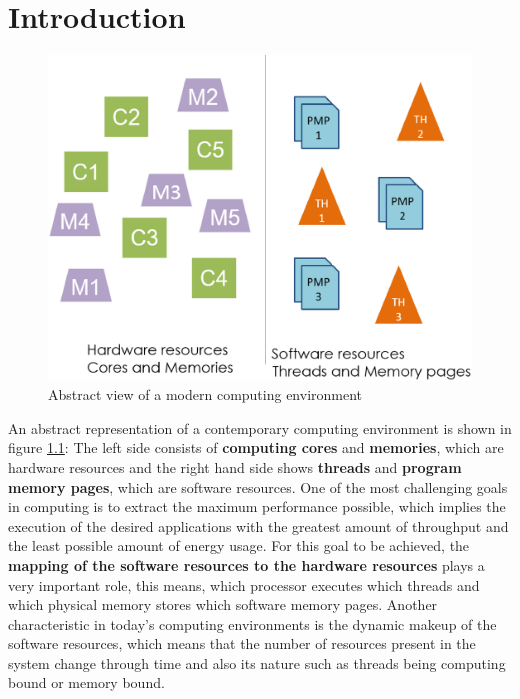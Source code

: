 \chapter{Introduction}\label{chapter:intro}

\begin{figure}[ht]
	\centering
		\includegraphics[width=.6\textwidth]{figures/abstract-env.eps}
		\caption[Abstract view of a modern computing environment]{Abstract view of a modern computing environment}
		\label{fig:abstract-cmpenv}
\end{figure}

An abstract representation of a contemporary computing environment is shown in figure \ref{fig:abstract-cmpenv}: The left side consists of \textbf{computing cores} and \textbf{memories}, which are hardware resources and the right hand side shows \textbf{threads} and \textbf{program memory pages}, which are software resources. One of the most challenging goals in computing is to extract the maximum performance possible, which implies the execution of the desired applications with the greatest amount of throughput and the least possible amount of energy usage. For this goal to be achieved, the \textbf{mapping of the software resources to the hardware resources} plays a very important role, this means, which processor executes which threads and which physical memory stores which software memory pages. Another characteristic in today's computing environments is the dynamic makeup of the software resources, which means that the number of resources present in the system change through time and also its nature such as threads being computing bound or memory bound. 

